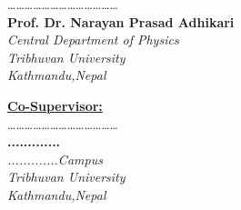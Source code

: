 \documentclass[12pt,a4paper]{article}
\begin{document}
	\ldots\ldots\ldots\ldots\ldots\ldots\ldots\ldots\ldots\ldots\ldots\ldots\ldots\\ \noindent \textbf{{Prof. Dr. Narayan Prasad Adhikari}}\\ \textit{Central Department of Physics}\\\textit{Tribhuvan University} \\{\textit{Kathmandu,Nepal}}\\
	
	\noindent 

 
	\noindent \textbf{\underline{Co-Supervisor:}}\vspace*{0.4cm}\\
	\ldots\ldots\ldots\ldots\ldots\ldots\ldots\ldots\ldots\ldots\ldots\ldots\ldots\\ \noindent \textbf{{.............}}\\ \textit{ .............Campus}\\\textit{Tribhuvan University} \\{\textit{Kathmandu,Nepal}}
	
	\pagebreak
\end{document}
